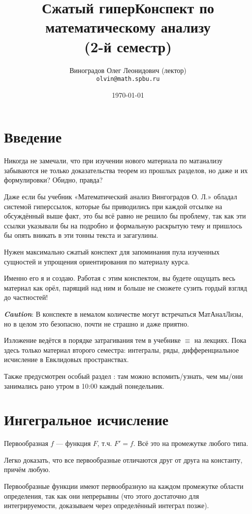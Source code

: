 \documentclass[12pt, a4paper]{article}
\title{Сжатый гиперКонспект по математическому анализу \\(2-й семестр)}
\author{
  \vova
  \and
  Виноградов Олег Леонидович (лектор)\\
  \texttt{olvin@math.spbu.ru}
}
\date{\today}
\begin{document}
  \maketitle
  \newpage
  \tableofcontents
  \newpage


  \section{Введение}

  Никогда не замечали, что при изучении нового материала по матанализу забываются не только доказательства теорем из прошлых разделов, но даже и их формулировки?
  Обидно, правда?

  Даже если бы учебник «Математический анализ Вингоградов О. Л.» обладал системой гиперссылок, которые бы приводились при каждой отсылке на обсуждённый выше факт, 
  это бы всё равно не решило бы проблему, так как эти ссылки указывали бы на подробно и формальную раскрытую тему и пришлось бы опять вникать в эти тонны текста и загагулины.

  Нужен максимально сжатый конспект для запоминания пула изученных сущностей и упрощения ориентирования по материалу курса.
  
  Именно его я и создаю.
  Работая с этим конспектом, вы будете ощущать весь материал как орёл, парящий над ним и больше не сможете сузить гордый взгляд до частностей!

  \textit{\textbf{Caution}}: В конспекте в немалом количестве могут встречаться МатАналЛизы, но в целом это безопасно, почти не страшно и даже приятно.

  Изложение ведётся в порядке затрагивания тем в учебнике $\equiv$ на лекциях.
  Пока здесь только материал второго семестра: интегралы, ряды, дифференциальное исчисление в Евклидовых пространствах.

  Также предусмотрен особый раздел : там можно вспомить/узнать, чем мы/они занимались рано утром в 10:00 каждый понедельник.


  \section{Ингегральное исчисление}

  Первообразная $f$ — функция $F$, т.ч. $F' = f$. Всё это на промежутке любого типа.

  Легко доказать, что все первообразные отличаются друг от друга на константу, причём любую.

  Первообразные функции имеют первообразную на каждом промежутке области определения, так как они непрерывны (что этого достаточно для интегрируемости, доказываем через определённый интеграл позже).
\end{document}
